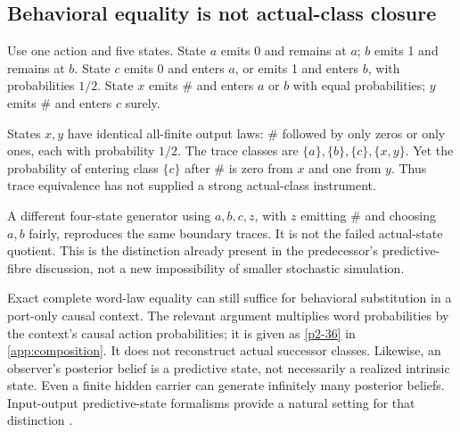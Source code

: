 \subsection{Behavioral equality is not actual-class closure}
\begin{example}\label{p2-26}\label{ex:trace}
Use one action and five states. State \(a\) emits 0 and remains at \(a\); \(b\) emits 1 and remains at \(b\). State \(c\) emits 0 and enters \(a\), or emits 1 and enters \(b\), with probabilities \(1/2\). State \(x\) emits \(\#\) and enters \(a\) or \(b\) with equal probabilities; \(y\) emits \(\#\) and enters \(c\) surely.

States \(x,y\) have identical all-finite output laws: \(\#\) followed by only zeros or only ones, each with probability \(1/2\). The trace classes are \(\{a\},\{b\},\{c\},\{x,y\}\). Yet the probability of entering class \(\{c\}\) after \(\#\) is zero from \(x\) and one from \(y\). Thus trace equivalence has not supplied a strong actual-class instrument.

A different four-state generator using \(a,b,c,z\), with \(z\) emitting \(\#\) and choosing \(a,b\) fairly, reproduces the same boundary traces. It is not the failed actual-state quotient. This is the distinction already present in the predecessor's predictive-fibre discussion, not a new impossibility of smaller stochastic simulation.
\end{example}
Exact complete word-law equality can still suffice for behavioral substitution in a port-only causal context. The relevant argument multiplies word probabilities by the context's causal action probabilities; it is given as \cref{p2-36} in \cref{app:composition}. It does not reconstruct actual successor classes. Likewise, an observer's posterior belief is a predictive state, not necessarily a realized intrinsic state. Even a finite hidden carrier can generate infinitely many posterior beliefs. Input-output predictive-state formalisms provide a natural setting for that distinction \cite{BarnettCrutchfield2014}.

